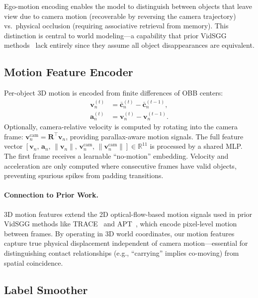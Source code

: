 \documentclass[runningheads]{llncs}
\newcommand{\mR}{\mathbb{R}}
\newcommand{\mat}[1]{\bm{#1}}
\begin{document}
Ego-motion encoding enables the model to distinguish between objects that leave view due to camera motion (recoverable by reversing the camera trajectory) vs.\ physical occlusion (requiring associative retrieval from memory).  This distinction is central to world modeling---a capability that prior VidSGG methods~\cite{cong2021spatial,ji2020action} lack entirely since they assume all object disappearances are equivalent.


\subsection{Motion Feature Encoder}
\label{sec:motion_encoder}

Per-object 3D motion is encoded from finite differences of OBB centers:
\begin{align}
    \mat{v}_n^{(t)} &= \bar{\mat{c}}_n^{(t)} - \bar{\mat{c}}_n^{(t-1)}, \label{eq:velocity} \\
    \mat{a}_n^{(t)} &= \mat{v}_n^{(t)} - \mat{v}_n^{(t-1)}. \label{eq:accel}
\end{align}
Optionally, camera-relative velocity is computed by rotating into the camera frame:
$\mat{v}_n^{\text{cam}} = \mat{R}^{\!\top}\mat{v}_n$, providing parallax-aware motion signals.  The full feature vector $[\mat{v}_n,\,\mat{a}_n,\,\|\mat{v}_n\|,\,\mat{v}_n^{\text{cam}},\,\|\mat{v}_n^{\text{cam}}\|] \in \mR^{11}$ is processed by a shared MLP.  The first frame receives a learnable ``no-motion'' embedding.  Velocity and acceleration are only computed where consecutive frames have valid objects, preventing spurious spikes from padding transitions.

\paragraph{Connection to Prior Work.}  3D motion features extend the 2D optical-flow-based motion signals used in prior VidSGG methods like TRACE~\cite{teng2021target} and APT~\cite{li2022dynamic}, which encode pixel-level motion between frames.  By operating in 3D world coordinates, our motion features capture true physical displacement independent of camera motion---essential for distinguishing contact relationships (e.g., ``carrying'' implies co-moving) from spatial coincidence.


\subsection{Label Smoother}
\label{sec:label_smoother}
\end{document}
